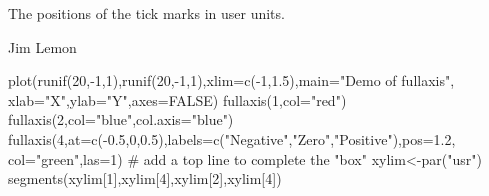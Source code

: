 \begin{Value}
The positions of the tick marks in user units.
\end{Value}
\begin{Author}\relax
Jim Lemon
\end{Author}
\begin{SeeAlso}\relax
{}
\end{SeeAlso}
\begin{Examples}
\begin{ExampleCode}
 plot(runif(20,-1,1),runif(20,-1,1),xlim=c(-1,1.5),main="Demo of fullaxis",
  xlab="X",ylab="Y",axes=FALSE)
 fullaxis(1,col="red")
 fullaxis(2,col="blue",col.axis="blue")
 fullaxis(4,at=c(-0.5,0,0.5),labels=c("Negative","Zero","Positive"),pos=1.2,
  col="green",las=1)
 # add a top line to complete the "box"
 xylim<-par("usr")
 segments(xylim[1],xylim[4],xylim[2],xylim[4])
\end{ExampleCode}
\end{Examples}

